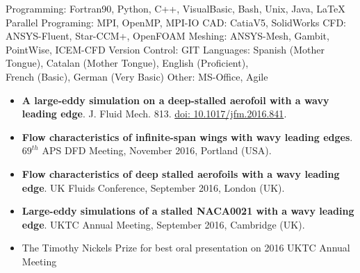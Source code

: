 \documentclass[10pt,a4paper]{article}
\begin{document}

\inlineheadsection  %
  {Programming:}
  {Fortran90, Python, C++, VisualBasic, Bash, Unix, Java, \LaTeX}
\vspace{0.5em}
\inlineheadsection  %
  {Parallel Programing:}
  {MPI, OpenMP, MPI-IO}
\vspace{0.5em}
\inlineheadsection  %
  {CAD:}
  {CatiaV5, SolidWorks}
\vspace{0.5em}
\inlineheadsection  %
  {CFD:}
  {ANSYS-Fluent, Star-CCM+, OpenFOAM}
\vspace{0.5em}
\inlineheadsection  %
  {Meshing:}
  {ANSYS-Mesh, Gambit, PointWise, ICEM-CFD}
\vspace{0.5em}
\inlineheadsection  %
  {Version Control:}
  {GIT}
\vspace{0.5em}
\inlineheadsection
  {Languages:}
  {Spanish (Mother Tongue), Catalan (Mother Tongue), English (Proficient),\\ French (Basic), German (Very Basic)}
\vspace{0.5em}
\inlineheadsection  %
  {Other:}
  {MS-Office, Agile}
\vspace{0.5em}


\spacedhrule{1.6em}{-0.4em}

\begin{itemize}
\item \textbf{A large-eddy simulation on a deep-stalled aerofoil with a wavy leading edge}. J. Fluid Mech. 813. \href{https://doi.org/10.1017/jfm.2016.841}{doi: 10.1017/jfm.2016.841}.
\item \textbf{Flow characteristics of infinite-span wings with wavy leading edges}. $69^{th}$ APS DFD Meeting, November 2016, Portland (USA). 
\item \textbf{Flow characteristics of deep stalled aerofoils with a wavy
leading edge}. UK Fluids Conference, September 2016, London (UK). 
\item \textbf{Large-eddy simulations of a stalled NACA0021 with a wavy
leading edge}. UKTC Annual Meeting, September 2016, Cambridge (UK).
\end{itemize}

\spacedhrule{1.6em}{-0.4em}
\begin{itemize}
	\item The Timothy Nickels Prize for best oral presentation on 2016 UKTC Annual Meeting	
\end{itemize}
\end{document}
